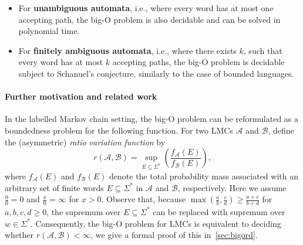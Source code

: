 \documentclass[10pt,a4paper]{amsart}
\numberwithin{equation}{section}
\theoremstyle{plain}
\theoremstyle{definition}
\theoremstyle{remark}
\newcommand\pbra[1]{\left( #1 \right)}
\newcommand\tvra{\mathit{r}}
\begin{document}
\begin{itemize}
Bounded languages form a well-known subclass of regular languages.
In fact, a regular (or even context-free) language $L$ is bounded if and only if the number of
words of length~$n$ in $L$ is at most polynomial in~$n$. All other regular
languages have, in contrast, exponential growth rate
(a fact rediscovered multiple times; see, e.g., references in Gawrychowski et~al.~\cite{GawrychowskiKRS10}).
Bounded languages have been studied from combinatorial and algorithmic points
of view since the 1960s~\cite{ginsburg1964bounded,GawrychowskiKRS10},
and have recently been used, e.g., in the analysis of
quantitative information flow problems in computer security~\cite{Mestel19fsttcs,Mestel19csf}.
In the context of labelled Markov chains,
languages that are subsets of $a_1^* a_2^* \ldots a_m^*$ (for individual
letters $a_1, \ldots, a_m \in \Sigma$) model consecutive arrival of $m$~events
in a discrete-time system. It is curious that natural decision problems
for such simple systems can lead to intricate algorithmic questions in number theory
at the border of decidability.
\item
For \textbf{unambiguous automata}, i.e., where every word has at most one accepting
path, the big-O problem is also decidable and can be solved in polynomial time.
\item
For \textbf{finitely ambiguous automata}, i.e., where there exists $k$, such that every word has at most $k$ accepting
paths, the big-O problem is decidable subject to Schanuel's conjecture, similarly to the case of bounded languages.
\end{itemize}

\paragraph*{Further motivation and related work}

In the labelled Markov chain setting,
the big-O problem can be reformulated as a boundedness problem for the following function.
For two LMCs $\mathcal A$ and $\mathcal B$, define
the (asymmetric) \emph{ratio variation function} by
\[\tvra(\mathcal A, \mathcal B) = \sup_{E \subseteq \Sigma^*} \pbra{\frac{f_{\mathcal A}(E) }{ f_{\mathcal B}(E)}},\]
where $f_{\mathcal A}(E)$ and $f_{\mathcal B}(E)$ denote the total probability mass associated with
an arbitrary set of finite words $E \subseteq \Sigma^*$ in $\mathcal A$ and $\mathcal B$, respectively.
Here we assume $\frac{0}{0}=0$ and $\frac{x}{0}=\infty$ for $x>0$.
Observe that, because $\max(\frac{a}{b},\frac{c}{d}) \ge \frac{a+c}{b+d}$ for $a,b,c,d\ge 0$, the supremum over $E \subseteq \Sigma^*$
can be replaced with supremum over $w\in \Sigma^*$. Consequently, the big-O problem for LMCs is equivalent to deciding whether $\tvra(\mathcal A, \mathcal B) <\infty$, we give a formal proof of this in~\cref{sec:bigord}.
\end{document}
